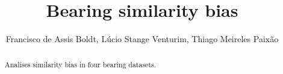 \documentclass[]{article}
\title{Bearing similarity bias}
\author{Francisco de Assis Boldt, Lúcio Stange Venturim, Thiago Meireles Paixão}
\begin{document}
\maketitle

\begin{abstract}
    Analises similarity bias in four bearing datasets.
\end{abstract}
\end{document}
